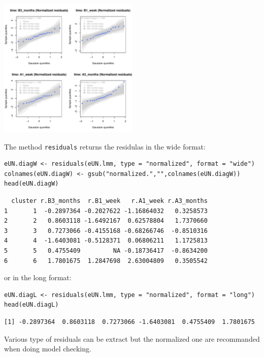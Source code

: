 \documentclass[12pt]{article}
\begin{document}
\begin{center}
\includegraphics[width=0.5\textwidth]{./figures/diag-qqplot.pdf}
\end{center}

\clearpage

The method \texttt{residuals} returns the residulas in the wide format:
\lstset{language=r,label= ,caption= ,captionpos=b,numbers=none}
\begin{lstlisting}
eUN.diagW <- residuals(eUN.lmm, type = "normalized", format = "wide")
colnames(eUN.diagW) <- gsub("normalized.","",colnames(eUN.diagW))
head(eUN.diagW)
\end{lstlisting}

\begin{verbatim}
  cluster r.B3_months  r.B1_week   r.A1_week r.A3_months
1       1  -0.2897364 -0.2027622 -1.16864032   0.3258573
2       2   0.8603118 -1.6492167  0.62578804   1.7370660
3       3   0.7273066 -0.4155168 -0.68266746  -0.8510316
4       4  -1.6403081 -0.5128371  0.06806211   1.1725813
5       5   0.4755409         NA -0.18736417  -0.8634200
6       6   1.7801675  1.2847698  2.63004809   0.3505542
\end{verbatim}


or in the long format:
\lstset{language=r,label= ,caption= ,captionpos=b,numbers=none}
\begin{lstlisting}
eUN.diagL <- residuals(eUN.lmm, type = "normalized", format = "long")
head(eUN.diagL)
\end{lstlisting}

\begin{verbatim}
[1] -0.2897364  0.8603118  0.7273066 -1.6403081  0.4755409  1.7801675
\end{verbatim}


Various type of residuals can be extract but the normalized one are
recommanded when doing model checking.
\end{document}
